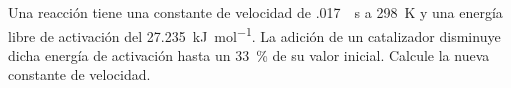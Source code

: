 Una reacción tiene una constante de velocidad de \SI{,017}{\per\second} a \SI{298}{\kelvin} y una energía libre de activación del \SI{27,235}{\kilo\joule\per\mol}. La adición de un catalizador disminuye dicha energía de activación hasta un \SI{33}{\percent} de su valor inicial. Calcule la nueva constante de velocidad.
